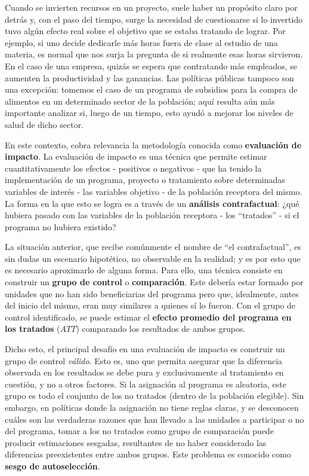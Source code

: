 \documentclass[../main.tex]{subfiles}
\begin{document}
Cuando se invierten recursos en un proyecto, suele haber un propósito claro por detrás y,
con el paso del tiempo, surge la necesidad de cuestionarse si lo invertido tuvo algún
efecto real sobre el objetivo que se estaba tratando de lograr. Por ejemplo, si uno decide
dedicarle más horas fuera de clase al estudio de una materia, es normal que nos surja la
pregunta de si realmente esas horas sirvieron. En el caso de una empresa, quizás se
espera que contratando más empleados, se aumenten la productividad y las ganancias. Las
políticas públicas tampoco son una excepción: tomemos el caso de un programa de subsidios
para la compra de alimentos en un determinado sector de la población; aquí resulta aún más
importante analizar si, luego de un tiempo, esto ayudó a mejorar los niveles de salud de
dicho sector.

En este contexto, cobra relevancia la metodología conocida como \textbf{evaluación de
impacto}. La evaluación de impacto es una técnica que permite estimar cuantitativamente
los efectos - positivos o negativos - que ha tenido la implementación de un programa,
proyecto o tratamiento sobre determinadas variables de interés - las variables objetivo -
de la población receptora del mismo. La forma en la que esto se logra es a través de un
\textbf{análisis contrafactual}: ¿qué hubiera pasado con las variables de la población
receptora - los ``tratados'' - si el programa no hubiera existido?

La situación anterior, que recibe comúnmente el nombre de ``el contrafactual'', es sin
dudas un escenario hipotético, no observable en la realidad; y es por esto que es
necesario aproximarlo de alguna forma. Para ello, una técnica consiste en construir un
\textbf{grupo de control} o \textbf{comparación}. Este debería estar formado por unidades
que no han sido beneficiarias del programa pero que, idealmente, antes del inicio del
mismo, eran muy similares a quienes sí lo fueron. Con el grupo de control identificado, se
puede estimar el \textbf{efecto promedio del programa en los tratados} (\(ATT\))
comparando los resultados de ambos grupos.

Dicho esto, el principal desafío en una evaluación de impacto es construir un grupo de
control \textit{válido}. Esto es, uno que permita asegurar que la diferencia observada en
los resultados se debe pura y exclusivamente al tratamiento en cuestión, y no a otros
factores. Si la asignación al programa es aleatoria, este grupo es todo el conjunto de los
no tratados (dentro de la población elegible). Sin embargo, en políticas donde la
asignación no tiene reglas claras, y se desconocen cuáles son las verdaderas razones que
han llevado a las unidades a participar o no del programa, tomar a los no tratados como
grupo de comparación puede producir estimaciones sesgadas, resultantes de no haber
considerado las diferencias preexistentes entre ambos grupos. Este problema es conocido
como \textbf{sesgo de autoselección}.
\end{document}
